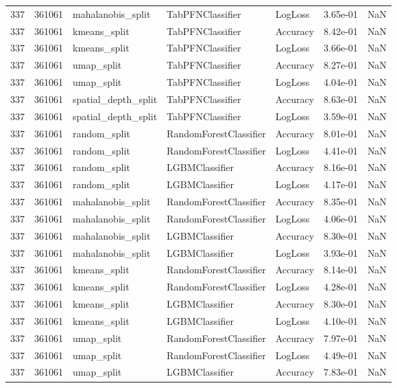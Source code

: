 \begin{tabular}{rrlllrr}
337 & 361061 & mahalanobis\_split & TabPFNClassifier & LogLoss & 3.65e-01 & NaN \\
337 & 361061 & kmeans\_split & TabPFNClassifier & Accuracy & 8.42e-01 & NaN \\
337 & 361061 & kmeans\_split & TabPFNClassifier & LogLoss & 3.66e-01 & NaN \\
337 & 361061 & umap\_split & TabPFNClassifier & Accuracy & 8.27e-01 & NaN \\
337 & 361061 & umap\_split & TabPFNClassifier & LogLoss & 4.04e-01 & NaN \\
337 & 361061 & spatial\_depth\_split & TabPFNClassifier & Accuracy & 8.63e-01 & NaN \\
337 & 361061 & spatial\_depth\_split & TabPFNClassifier & LogLoss & 3.59e-01 & NaN \\
337 & 361061 & random\_split & RandomForestClassifier & Accuracy & 8.01e-01 & NaN \\
337 & 361061 & random\_split & RandomForestClassifier & LogLoss & 4.41e-01 & NaN \\
337 & 361061 & random\_split & LGBMClassifier & Accuracy & 8.16e-01 & NaN \\
337 & 361061 & random\_split & LGBMClassifier & LogLoss & 4.17e-01 & NaN \\
337 & 361061 & mahalanobis\_split & RandomForestClassifier & Accuracy & 8.35e-01 & NaN \\
337 & 361061 & mahalanobis\_split & RandomForestClassifier & LogLoss & 4.06e-01 & NaN \\
337 & 361061 & mahalanobis\_split & LGBMClassifier & Accuracy & 8.30e-01 & NaN \\
337 & 361061 & mahalanobis\_split & LGBMClassifier & LogLoss & 3.93e-01 & NaN \\
337 & 361061 & kmeans\_split & RandomForestClassifier & Accuracy & 8.14e-01 & NaN \\
337 & 361061 & kmeans\_split & RandomForestClassifier & LogLoss & 4.28e-01 & NaN \\
337 & 361061 & kmeans\_split & LGBMClassifier & Accuracy & 8.30e-01 & NaN \\
337 & 361061 & kmeans\_split & LGBMClassifier & LogLoss & 4.10e-01 & NaN \\
337 & 361061 & umap\_split & RandomForestClassifier & Accuracy & 7.97e-01 & NaN \\
337 & 361061 & umap\_split & RandomForestClassifier & LogLoss & 4.49e-01 & NaN \\
337 & 361061 & umap\_split & LGBMClassifier & Accuracy & 7.83e-01 & NaN \\

\end{tabular}
